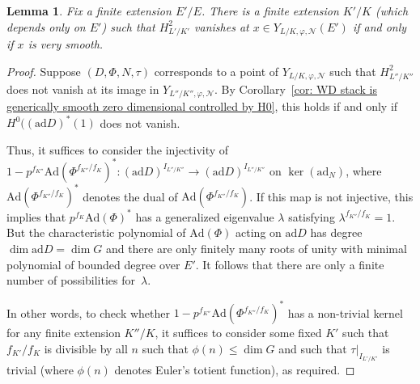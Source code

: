 \documentclass{amsart}
\renewcommand{\mathbb}{\mathbf}
\def\Ad{\mathrm{Ad}}
\def\ad{\mathrm{ad}}
\newtheorem{lemma}[subsubsection]{Lemma}
\theoremstyle{definition}
\theoremstyle{remark}
\newcommand{\mar}[1]{}
\newcommand{\mar}[1]{\marginpar{\raggedright\tiny squirrel #1}}
\newcommand{\Q}{\QQ}
\newcommand{\QQ}{{\mathbb Q}}
\newcommand{\Qp}{\Q_p}
\DeclareMathOperator{\GL}{GL}
\begin{document}
\begin{lemma}\label{lem: existence of uniform extension}%
Fix a finite extension $E'/E$.  There is a finite extension $K'/K$ \emph{(}which depends only on $E'$\emph{)} such that $H_{L'/K'}^2$ vanishes at $x\in Y_{L/K,\varphi,\mathcal{N}}(E')$ if and only if $x$ is very smooth.
\end{lemma}
\begin{proof}
Suppose $(D,\Phi,N,\tau)$ corresponds to a point of $Y_{L/K,\varphi,\mathcal N}$
such that $H_{L''/K''}^2$ does not vanish at its image in
$Y_{L''/K'',\varphi,\mathcal N}$.  By Corollary~\ref{cor: WD stack is generically smooth zero dimensional
  controlled by H0}, this holds if and only if $H^0((\ad D)^\ast(1)$ does not vanish.

Thus, it suffices to consider the injectivity of
$1-p^{f_{K''}}\Ad(\Phi^{f_{K''}/f_K})^\ast:(\ad D)^{I_{L''/K''}}\rightarrow
(\ad D)^{I_{L''/K''}}$ on $\ker(\ad_N)$, where $\Ad(\Phi^{f_{K''}/f_K})^\ast$ denotes the dual of $\Ad(\Phi^{f_{K''}/f_K})$.  If this map is not injective, this implies that
$p^{f_K}\Ad(\Phi)^\ast$ has a generalized eigenvalue $\lambda$ satisfying
$\lambda^{f_{K''}/f_K}=1$. %
But the
characteristic polynomial of $\Ad(\Phi)$ acting on $\ad D$ has degree 
$\dim \ad D=\dim G$ and there are only finitely many roots of unity with minimal polynomial of bounded degree over $E'$.  It follows that there are only a
finite number of possibilities for~$\lambda$.  

In other words, to check whether $1-p^{f_{K''}}\Ad(\Phi^{f_{K''}/f_K})^\ast$ has a non-trivial kernel for any finite extension $K''/K$, it suffices to consider some fixed $K'$ such
that $f_{K'}/f_K$ is divisible by all $n$ such that $\phi(n)\leq \dim G$ and such that $\tau|_{I_{L'/K'}}$
is trivial (where $\phi(n)$ denotes Euler's totient function), as required.
\end{proof}
\end{document}
